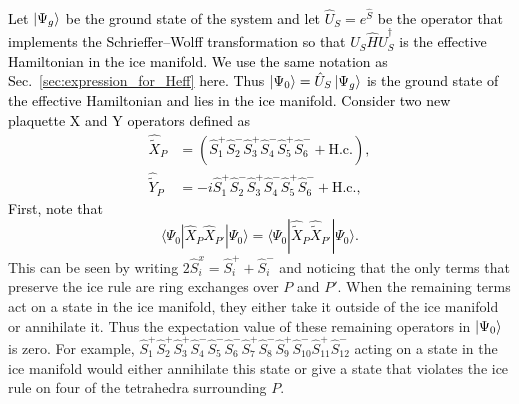 \documentclass[twocolumn,superscriptaddress,amsmath,amssymb,aps,prx,nofootinbib]{revtex4-2}
\newcommand{\newtext}[1]{\textcolor{black}{#1}}
\begin{document}
\newtext{Let $\ket{\Psi_g}$ be the ground state of the system and let $\hat{U}_{S} = e^{\hat{S}}$ be the operator that implements the Schrieffer–Wolff transformation so that $\hat{U}_{S} \hat{H} \hat{U}_{S}^\dagger$ is the effective Hamiltonian in the ice manifold.
We use the same notation as Sec.~\ref{sec:expression_for_Heff} here.
Thus $\ket{\Psi_0} = \hat{U}_S \ket{\Psi_g}$ is the ground state of the effective Hamiltonian and lies in the ice manifold. 
Consider two new plaquette X and Y operators defined as
 \begin{equation} \label{eq:xp_yp_tilde_def}
  \begin{aligned}
    \hat{\tilde{X}}_{P} &=  \left( \hat{S}_1^+ \hat{S}_2^-\hat{S}_3^+\hat{S}_4^-\hat{S}_5^+\hat{S}_6^-   + \text{H.c.} \right) ,\\
      \hat{\tilde{Y}}_{P} & = -i \hat{S}_1^+ \hat{S}_2^-\hat{S}_3^+\hat{S}_4^-\hat{S}_5^+\hat{S}_6^-   + \text{H.c.},
\end{aligned}
\end{equation}
First, note that 
\begin{equation} \label{eq:xpxp_to_tildexp_tildexp}
\langle \Psi_0 | \hat{X}_P \hat{X}_{P'} | \Psi_0 \rangle = \langle \Psi_0  | \hat{\tilde{X}}_P \hat{\tilde{X}}_{P'} | \Psi_0 \rangle. 
\end{equation}}
This can be seen by writing $2\hat{S}^x_i  = \hat{S}^+_i + \hat{S}^-_i$ and noticing that the only terms that preserve the ice rule are ring exchanges over $P$ and $P'$.
When the remaining terms act on a state in the ice manifold, they either take it outside of the ice manifold or annihilate it. Thus the  expectation value of these remaining operators in $\ket{\Psi_0}$ is zero. 
For example, $\hat{S}_1^+ \hat{S}_2^+ \hat{S}_3^+ \hat{S}_4^- \hat{S}_5^- \hat{S}_6^- \hat{S}_{7}^+ \hat{S}_{8}^- \hat{S}_{9}^+ \hat{S}_{10}^- \hat{S}_{11}^+ \hat{S}_{12}^{-}$ acting on a state in the ice manifold would either annihilate this state or give a state that violates the ice rule on four of the tetrahedra surrounding $P$.
\end{document}
